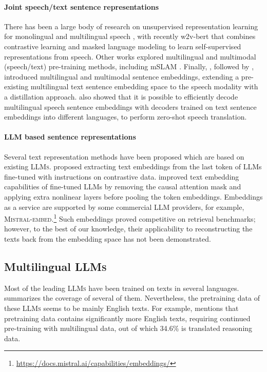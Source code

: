 \documentclass[twoside,11pt]{fairmeta}
\newcommand{\llm}{\textsc{LLM}\xspace}
\newcommand{\llms}{\textsc{LLMs}\xspace}
\begin{document}
\paragraph{Joint speech/text sentence representations}
There has been a large body of research on unsupervised representation learning for monolingual \citep{wav2vec2} and multilingual speech \citep{babu2021xls}, with recently w2v-bert \citep{chung2021w2v} that combines contrastive learning and masked language modeling to learn self-supervised representations from speech. Other works explored multilingual and multimodal (speech/text) pre-training methods, including mSLAM \citep{mslam}. Finally, \citet{Duquenne:2021:nips_mine}, followed by \citet{khurana2022samu}, introduced multilingual and multimodal sentence embeddings, extending a pre-existing multilingual text sentence embedding space to the speech modality with a distillation approach. \citet{tmodules:acl,interspeech} also showed that it is possible to efficiently decode multilingual speech sentence embeddings with decoders trained on text sentence embeddings into different languages, to perform zero-shot speech translation.

\paragraph{\llm based sentence representations}

Several text representation methods have been proposed which are based on existing \llms.
\citet{wang-etal-2024-improving-text} proposed extracting text embeddings from the last token of LLMs fine-tuned with instructions on contrastive data. \citet{lee2024nv} improved text embedding capabilities of fine-tuned LLMs by removing the causal attention mask and applying extra nonlinear layers before pooling the token embeddings. 
Embeddings as a service are supported by some commercial LLM providers, for example, \textsc{Mistral-embed}.\footnote{\url{https://docs.mistral.ai/capabilities/embeddings/}}
Such embeddings proved competitive on retrieval benchmarks; however, to the best of our knowledge, their applicability to reconstructing the texts back from the embedding space has not been demonstrated.


\subsection{Multilingual \llms}

Most of the leading \llms have been trained on texts in several languages.  summarizes the coverage of several of them. Nevertheless, the pretraining data of these \llms seems to be mainly English texts. For example, \citet{llama3.arxiv.2024} mentions that pretraining data contains significantly more English texts, requiring continued pre-training with multilingual data, out of which 34.6\% is translated reasoning data.
\end{document}
